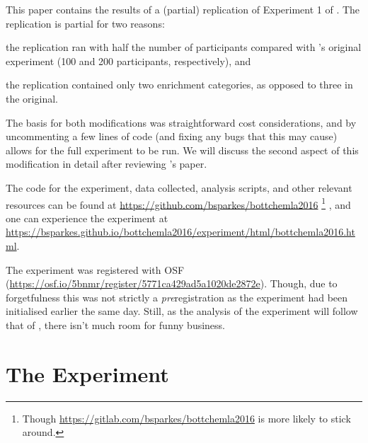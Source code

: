 \documentclass[10pt]{article}
\begin{document}
\begin{multicols}{2}
This paper contains the results of a (partial) replication of Experiment 1 of \textcite{Bott:2016aa}.
The replication is partial for two reasons:
\begin{enumerate*}[label=\arabic*.]
\item the replication ran with half the number of participants compared with \citeauthor{Bott:2016aa}'s original experiment (100 and 200 participants, respectively), and
\item the replication contained only two enrichment categories, as opposed to three in the original.
\end{enumerate*}
The basis for both modifications was straightforward cost considerations, and by uncommenting a few lines of code (and fixing any bugs that this may cause) allows for the full experiment to be run.
We will discuss the second aspect of this modification in detail after reviewing \citeauthor{Bott:2016aa}'s paper.

The code for the experiment, data collected, analysis scripts, and other relevant resources can be found at \url{https://github.com/bsparkes/bottchemla2016}\nolinebreak
\footnote{Though \url{https://gitlab.com/bsparkes/bottchemla2016} is more likely to stick around.}\nolinebreak
, and one can experience the experiment at \url{https://bsparkes.github.io/bottchemla2016/experiment/html/bottchemla2016.html}.

The experiment was registered with OSF (\url{https://osf.io/5bnmr/register/5771ca429ad5a1020de2872e}).
Though, due to forgetfulness this was not strictly a \emph{pre}registration as the experiment had been initialised earlier the same day.
Still, as the analysis of the experiment will follow that of \citeauthor{Bott:2016aa}, there isn't much room for funny business.


\section{The Experiment}
\label{sec:experiment}


\end{multicols}
\end{document}
